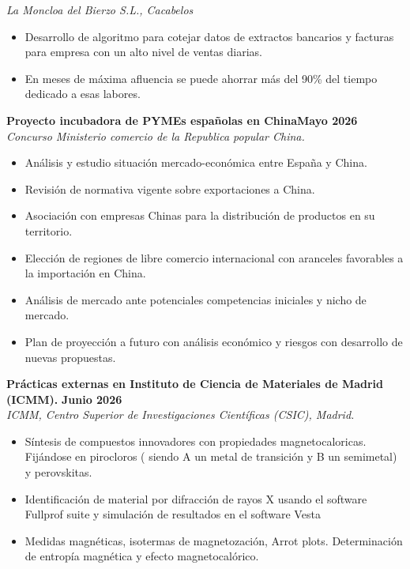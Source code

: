 \documentclass[11pt,a4paper]{article}
\begin{document}
\textit{La Moncloa del Bierzo S.L., Cacabelos}
\begin{itemize}[leftmargin=*,nosep]
    \item Desarrollo de algoritmo para cotejar datos de extractos bancarios y facturas para empresa con un alto nivel de ventas diarias.
    \item En meses de máxima afluencia se puede ahorrar más del 90\% del tiempo dedicado a esas labores.
\end{itemize}
\vspace{5mm}
\textbf{Proyecto incubadora de PYMEs españolas en China}\hfill\textbf{Mayo 2026}\\
\textit{Concurso Ministerio comercio de la Republica popular China.}
\begin{itemize}[leftmargin=*,nosep]
    \item Análisis y estudio situación mercado-económica entre España y China.
    \item Revisión de normativa vigente sobre exportaciones a China.
    \item Asociación con empresas Chinas para la distribución de productos en su territorio.
    \item Elección de regiones de libre comercio internacional con aranceles favorables a la importación en China.
    \item Análisis de mercado ante potenciales competencias iniciales y nicho de mercado.
    \item Plan de proyección a futuro con análisis económico y riesgos con desarrollo de nuevas propuestas.
\end{itemize}
\vspace{5mm}
\textbf{Prácticas externas en Instituto de Ciencia de Materiales de Madrid (ICMM).} \hfill \textbf{Junio 2026}\\
\textit{ICMM, Centro Superior de Investigaciones Científicas (CSIC), Madrid.}
\begin{itemize}[leftmargin=*,nosep]
    \item Síntesis de compuestos innovadores con propiedades magnetocaloricas. Fijándose en pirocloros ( siendo A un metal de transición y B un semimetal) y perovskitas.
    \item Identificación de material por difracción de rayos X usando el software Fullprof suite y simulación de resultados en el software Vesta
    \item Medidas magnéticas, isotermas de magnetozación, Arrot plots. Determinación de entropía magnética y efecto magnetocalórico.
\end{itemize}
\newpage
\end{document}
